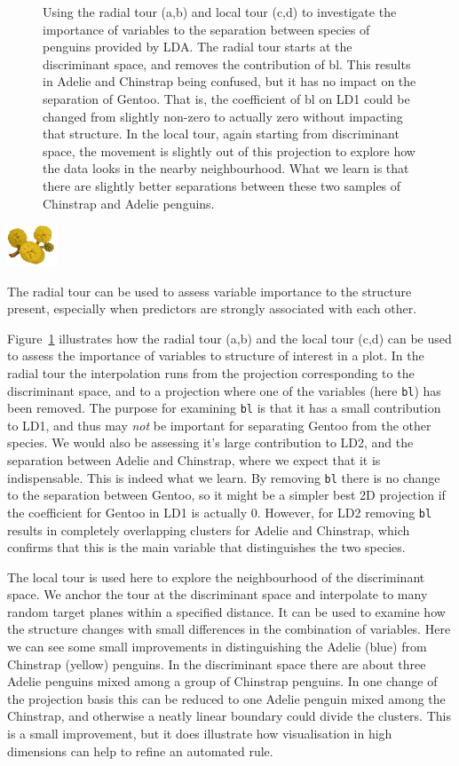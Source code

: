 \documentclass[
  letterpaper,
]{krantz}
\newcommand{\infobox}[1]{%
\noindent\colorbox{info!30}{%
\begin{minipage}{0.98\linewidth}%
    \centering%
    \begin{minipage}[c]{0.15\linewidth} %
      \includegraphics[width=1.5cm]{images/mulga-flowers2.png} %
    \end{minipage}%
    \hfill %
    \begin{minipage}[c]{0.8\linewidth} %
      \bigskip%
      \textsf{#1}%
      \bigskip%
    \end{minipage}%
    \hspace*{3mm}%
  \end{minipage}%
}%
}
\begin{document}
\begin{figure}
\begin{minipage}{0.50\linewidth}
\end{minipage}%

\caption{\label{fig-interpret-pdf}Using the radial tour (a,b) and local
tour (c,d) to investigate the importance of variables to the separation
between species of penguins provided by LDA. The radial tour starts at
the discriminant space, and removes the contribution of bl. This results
in Adelie and Chinstrap being confused, but it has no impact on the
separation of Gentoo. That is, the coefficient of bl on LD1 could be
changed from slightly non-zero to actually zero without impacting that
structure. In the local tour, again starting from discriminant space,
the movement is slightly out of this projection to explore how the data
looks in the nearby neighbourhood. What we learn is that there are
slightly better separations between these two samples of Chinstrap and
Adelie penguins. }

\end{figure}%

\infobox{The radial tour can be used to assess variable importance to the structure present, especially when predictors are strongly associated with each other.}

Figure~\ref{fig-interpret-pdf} illustrates how the radial tour (a,b) and
the local tour (c,d) can be used to assess the importance of variables
to structure of interest in a plot. In the radial tour the interpolation
runs from the projection corresponding to the discriminant space, and to
a projection where one of the variables (here \texttt{bl}) has been
removed. The purpose for examining \texttt{bl} is that it has a small
contribution to LD1, and thus may \emph{not} be important for separating
Gentoo from the other species. We would also be assessing it's large
contribution to LD2, and the separation between Adelie and Chinstrap,
where we expect that it is indispensable. This is indeed what we learn.
By removing \texttt{bl} there is no change to the separation between
Gentoo, so it might be a simpler best 2D projection if the coefficient
for Gentoo in LD1 is actually 0. However, for LD2 removing \texttt{bl}
results in completely overlapping clusters for Adelie and Chinstrap,
which confirms that this is the main variable that distinguishes the two
species.

The local tour is used here to explore the neighbourhood of the
discriminant space. We anchor the tour at the discriminant space and
interpolate to many random target planes within a specified distance. It
can be used to examine how the structure changes with small differences
in the combination of variables. Here we can see some small improvements
in distinguishing the Adelie (blue) from Chinstrap (yellow) penguins. In
the discriminant space there are about three Adelie penguins mixed among
a group of Chinstrap penguins. In one change of the projection basis
this can be reduced to one Adelie penguin mixed among the Chinstrap, and
otherwise a neatly linear boundary could divide the clusters. This is a
small improvement, but it does illustrate how visualisation in high
dimensions can help to refine an automated rule.
\end{document}
